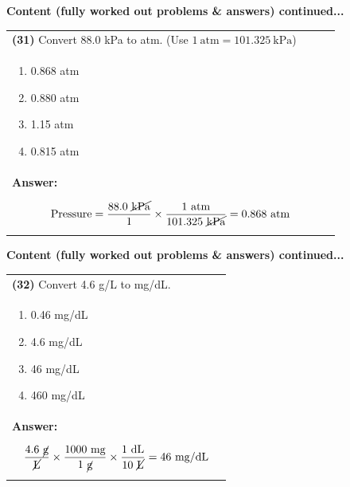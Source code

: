 \documentclass{article}
\begin{document}
\newpage
\noindent
{\large\textbf{Content (fully worked out problems \& answers) continued...}}\\[0.2em]
\vspace{0.2cm}
\begin{tabular}{|p{0.9\linewidth}|}
\hline
\vspace{0.2cm}
\textbf{(31)} Convert 88.0 kPa to atm. (Use $1~\text{atm}=101.325~\text{kPa}$)\\
\begin{minipage}[t]{0.85\linewidth}
\begin{enumerate}[label=\alph*.]
   \item 0.868 atm \
   \item 0.880 atm \
   \item 1.15 atm \
   \item 0.815 atm
\end{enumerate}
\end{minipage}\\
\hline
\vspace{0.2cm}
\textbf{Answer:}\\
\[
\text{Pressure}=\frac{88.0~\cancel{\text{kPa}}}{1}\times\frac{1~\text{atm}}{101.325~\cancel{\text{kPa}}}=0.868~\text{atm}
\] \\
\hline
\end{tabular}

\newpage
\noindent
{\large\textbf{Content (fully worked out problems \& answers) continued...}}\\[0.2em]
\vspace{0.2cm}
\begin{tabular}{|p{0.9\linewidth}|}
\hline
\vspace{0.2cm}
\textbf{(32)} Convert 4.6 g/L to mg/dL.\\
\begin{minipage}[t]{0.85\linewidth}
\begin{enumerate}[label=\alph*.]
   \item 0.46 mg/dL \
   \item 4.6 mg/dL \
   \item 46 mg/dL \
   \item 460 mg/dL
\end{enumerate}
\end{minipage}\\
\hline
\vspace{0.2cm}
\textbf{Answer:}\\
\[
\frac{4.6~\cancel{\text{g}}}{\cancel{\text{L}}}\times\frac{1000~\text{mg}}{1~\cancel{\text{g}}}\times\frac{1~\text{dL}}{10~\cancel{\text{L}}}=46~\text{mg/dL}
\] \\
\hline
\end{tabular}
\end{document}
